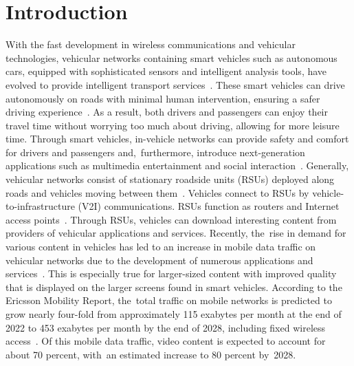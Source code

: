 \documentclass[sensors,aricle,accept,pdftex,moreauthors]{Definitions/mdpi}
\begin{document}
\section{Introduction}
With the fast development in wireless communications and vehicular technologies, vehicular networks containing smart vehicles such as autonomous cars, equipped with sophisticated sensors and intelligent analysis tools, have evolved to provide intelligent transport services~\cite{Shahwani2021, Zhe2020}.
These smart vehicles can drive autonomously on roads with minimal human intervention, ensuring a safer driving experience~\cite{yuan2018}.
As a result, both drivers and passengers can enjoy their travel time without worrying too much about driving, allowing for more leisure time.
Through smart vehicles, in-vehicle networks can provide safety and comfort for drivers and passengers and,~furthermore, introduce next-generation applications such as multimedia entertainment and social interaction~\cite{Lee2021}.
Generally, vehicular networks consist of stationary roadside units (RSUs) deployed along roads and vehicles moving between them~\cite{Kim2017}. 
Vehicles connect to RSUs by vehicle-to-infrastructure (V2I) communications.
RSUs function as routers and Internet access points~\cite{Reis2014}. 
Through RSUs, vehicles can download interesting content from providers of vehicular applications and services.
Recently, the~rise in demand for various content in vehicles has led to an increase in mobile data traffic on vehicular networks due to the development of numerous applications and services~\cite{Kumer2013, Pranav2019, Reichardt2002, Yen2020}.
This is especially true for larger-sized content with improved quality that is displayed on the larger screens found in smart vehicles. 
According to the Ericsson Mobility Report, the~total traffic on mobile networks is predicted to grow nearly four-fold from approximately 115 exabytes per month at the end of 2022 to 453 exabytes per month by the end of 2028, including fixed wireless access~\cite{Ericsson}.
Of this mobile data traffic, video content is expected to account for about 70 percent, with~an estimated increase to 80 percent by~2028.
\end{document}
